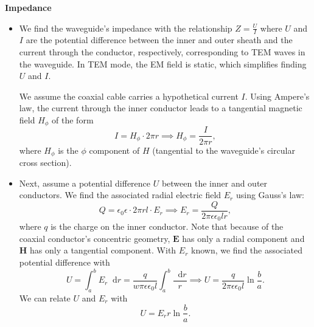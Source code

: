 \documentclass[11pt, a4paper]{article}
\newcommand{\diff}{\mathop{}\!\mathrm{d}} %
\renewcommand{\vec}[1]{\bm{#1}} %
\newcommand{\E}{\vec{E}}  %
\renewcommand{\H}{\vec{H}}  %
\newcommand{\e}{\epsilon}
\newcommand{\ee}{\epsilon_{0}}  %
\begin{document}
\textbf{Impedance}
\begin{itemize}
	\item We find the waveguide's impedance with the relationship $ Z = \frac{U}{I} $ where $ U $ and $ I $ are the potential difference between the inner and outer sheath and the current through the conductor, respectively, corresponding to TEM waves in the waveguide. In TEM mode, the EM field is static, which simplifies finding $ U $ and $ I $. 
	
	We assume the coaxial cable carries a hypothetical current $ I $. Using Ampere's law, the current through the inner conductor leads to a tangential magnetic field $ H_{\phi} $ of the form
	\begin{equation*}
		I = H_{\phi} \cdot 2\pi r  \implies H_{\phi} = \frac{I}{2\pi r},
	\end{equation*}
	where $ H_{\phi} $ is the $ \phi $ component of $ H $ (tangential to the waveguide's circular cross section). 
	
	\item Next, assume a potential difference $ U $ between the inner and outer conductors. We find the associated radial electric field $ E_{r} $ using Gauss's law:
	\begin{equation*}
		Q = \ee \e \cdot 2\pi r l \cdot E_{r} \implies E_{r} = \frac{Q}{2\pi \e \ee l r},
	\end{equation*}
	where $ q $ is the charge on the inner conductor. Note that because of the coaxial conductor's concentric geometry, $ \E $ has only a radial component and $ \H $ has only a tangential component. With $ E_{r} $ known, we find the associated potential difference with 
	\begin{equation*}
		U = \int_{a}^{b}E_{r}\diff r = \frac{q}{w\pi \e \ee l}\int_{a}^{b}\frac{\diff r}{r} \implies U = \frac{q}{2\pi \e \ee l}\ln\frac{b}{a}.
	\end{equation*}
	We can relate $ U $ and $ E_{r} $ with
	\begin{equation*}
		U = E_{r}r \ln \frac{b}{a}.
	\end{equation*}
	

\end{itemize}
\end{document}

